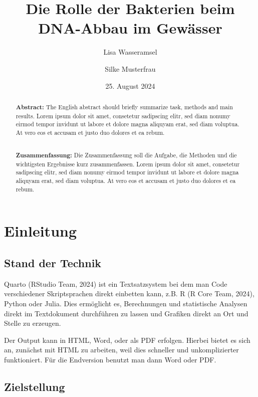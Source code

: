 \documentclass[
  11pt,
  a4paper,
]{tudscrreprt}
\institute{Institut für Hydrobiologie}
\author{Lisa Wasseramsel}
\title{Die Rolle der Bakterien beim DNA-Abbau im Gewässer}
\author{Silke Musterfrau}
\date{25. August 2024}
\renewcommand*\contentsname{Inhaltsverzeichnis}
\newcommand\contentsname{Inhaltsverzeichnis}
\begin{document}
\maketitle
\begin{abstract}
\textbf{Abstract:} The English abstract should briefly summarize task,
methods and main results. Lorem ipsum dolor sit amet, consetetur
sadipscing elitr, sed diam nonumy eirmod tempor invidunt ut labore et
dolore magna aliquyam erat, sed diam voluptua. At vero eos et accusam et
justo duo dolores et ea rebum.\\
\strut \\
\textbf{Zusammenfassung:} Die Zusammenfassung soll die Aufgabe, die
Methoden und die wichtigsten Ergebnisse kurz zusammenfassen. Lorem ipsum
dolor sit amet, consetetur sadipscing elitr, sed diam nonumy eirmod
tempor invidunt ut labore et dolore magna aliquyam erat, sed diam
voluptua. At vero eos et accusam et justo duo dolores et ea rebum.
\end{abstract}

\renewcommand*\contentsname{Inhaltsverzeichnis}
{
\hypersetup{linkcolor=}
\setcounter{tocdepth}{2}
\tableofcontents
}
\listoffigures
\listoftables
{}

\chapter{Einleitung}\label{einleitung}

\section{Stand der Technik}\label{stand-der-technik}

Quarto (RStudio Team, 2024) ist ein Textsatzsystem bei dem man Code
verschiedener Skriptsprachen direkt einbetten kann, z.B. R (R Core Team,
2024), Python oder Julia. Dies ermöglicht es, Berechnungen und
statistische Analysen direkt im Textdokument durchführen zu lassen und
Grafiken direkt an Ort und Stelle zu erzeugen.

Der Output kann in HTML, Word, oder als PDF erfolgen. Hierbei bietet es
sich an, zunächst mit HTML zu arbeiten, weil dies schneller und
unkomplizierter funktioniert. Für die Endversion benutzt man dann Word
oder PDF.

\section{Zielstellung}\label{zielstellung}
\end{document}
